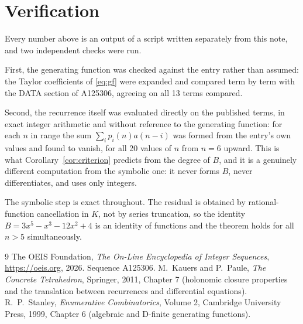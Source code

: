 \documentclass[11pt,a4paper]{article}
\theoremstyle{plain}
\theoremstyle{definition}
\begin{document}
\section{Verification}

Every number above is an output of a script written separately from this note, and two
independent checks were run.

First, the generating function was checked against the entry rather than assumed: the
Taylor coefficients of \eqref{eq:gf} were expanded and compared term by term with the DATA
section of A125306, agreeing on all 13 terms compared.

Second, the recurrence itself was evaluated directly on the published terms, in exact
integer arithmetic and without reference to the generating function: for each $n$ in range
the sum $\sum_{i}p_{i}(n)a(n-i)$ was formed from the entry's own values and found to
vanish, for all 20 values of $n$ from $n=6$ upward. This is what
Corollary~\ref{cor:criterion} predicts from the degree of $B$, and it is a genuinely
different computation from the symbolic one: it never forms $B$, never differentiates, and
uses only integers.

The symbolic step is exact throughout. The residual is obtained by rational-function
cancellation in $K$, not by series truncation, so the identity $B=3 x^{5} - x^{3} - 12 x^{2} + 4$ is an
identity of functions and the theorem holds for all $n>5$ simultaneously.

\begin{thebibliography}{9}
 The OEIS Foundation, \emph{The On-Line Encyclopedia of Integer Sequences},
\url{https://oeis.org}, 2026. Sequence A125306.
 M.~Kauers and P.~Paule, \emph{The Concrete Tetrahedron}, Springer, 2011,
Chapter 7 (holonomic closure properties and the translation between recurrences and
differential equations).
 R.~P.~Stanley, \emph{Enumerative Combinatorics}, Volume 2, Cambridge
University Press, 1999, Chapter 6 (algebraic and D-finite generating functions).
\end{thebibliography}
\end{document}
